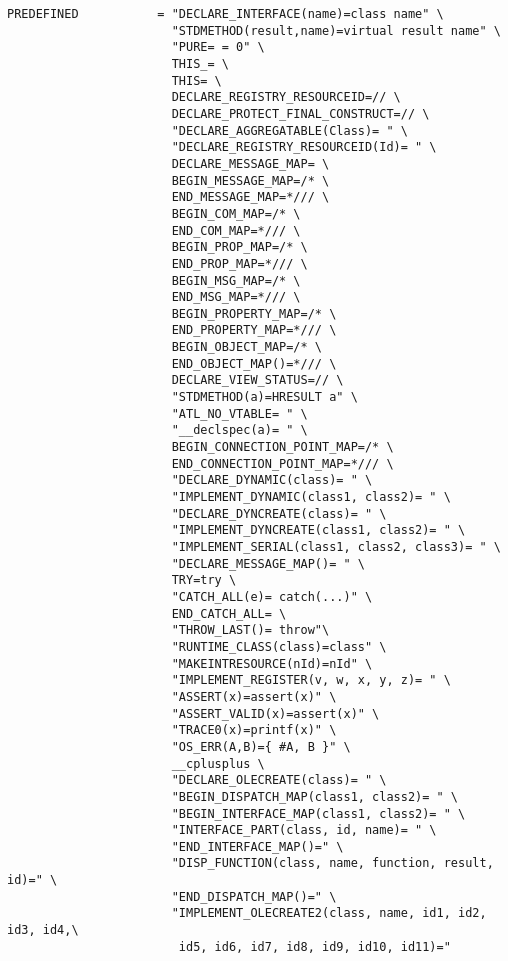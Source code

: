 \footnotesize\begin{verbatim}
PREDEFINED           = "DECLARE_INTERFACE(name)=class name" \
                       "STDMETHOD(result,name)=virtual result name" \
                       "PURE= = 0" \
                       THIS_= \
                       THIS= \
                       DECLARE_REGISTRY_RESOURCEID=// \
                       DECLARE_PROTECT_FINAL_CONSTRUCT=// \
                       "DECLARE_AGGREGATABLE(Class)= " \
                       "DECLARE_REGISTRY_RESOURCEID(Id)= " \
                       DECLARE_MESSAGE_MAP= \
                       BEGIN_MESSAGE_MAP=/* \
                       END_MESSAGE_MAP=*/// \
                       BEGIN_COM_MAP=/* \
                       END_COM_MAP=*/// \
                       BEGIN_PROP_MAP=/* \
                       END_PROP_MAP=*/// \
                       BEGIN_MSG_MAP=/* \
                       END_MSG_MAP=*/// \
                       BEGIN_PROPERTY_MAP=/* \
                       END_PROPERTY_MAP=*/// \
                       BEGIN_OBJECT_MAP=/* \
                       END_OBJECT_MAP()=*/// \
                       DECLARE_VIEW_STATUS=// \
                       "STDMETHOD(a)=HRESULT a" \
                       "ATL_NO_VTABLE= " \
                       "__declspec(a)= " \
                       BEGIN_CONNECTION_POINT_MAP=/* \
                       END_CONNECTION_POINT_MAP=*/// \
                       "DECLARE_DYNAMIC(class)= " \
                       "IMPLEMENT_DYNAMIC(class1, class2)= " \
                       "DECLARE_DYNCREATE(class)= " \
                       "IMPLEMENT_DYNCREATE(class1, class2)= " \
                       "IMPLEMENT_SERIAL(class1, class2, class3)= " \
                       "DECLARE_MESSAGE_MAP()= " \
                       TRY=try \
                       "CATCH_ALL(e)= catch(...)" \
                       END_CATCH_ALL= \
                       "THROW_LAST()= throw"\
                       "RUNTIME_CLASS(class)=class" \
                       "MAKEINTRESOURCE(nId)=nId" \
                       "IMPLEMENT_REGISTER(v, w, x, y, z)= " \
                       "ASSERT(x)=assert(x)" \
                       "ASSERT_VALID(x)=assert(x)" \
                       "TRACE0(x)=printf(x)" \
                       "OS_ERR(A,B)={ #A, B }" \
                       __cplusplus \
                       "DECLARE_OLECREATE(class)= " \
                       "BEGIN_DISPATCH_MAP(class1, class2)= " \
                       "BEGIN_INTERFACE_MAP(class1, class2)= " \
                       "INTERFACE_PART(class, id, name)= " \
                       "END_INTERFACE_MAP()=" \
                       "DISP_FUNCTION(class, name, function, result, id)=" \
                       "END_DISPATCH_MAP()=" \
                       "IMPLEMENT_OLECREATE2(class, name, id1, id2, id3, id4,\
                        id5, id6, id7, id8, id9, id10, id11)="
\end{verbatim}
\normalsize


